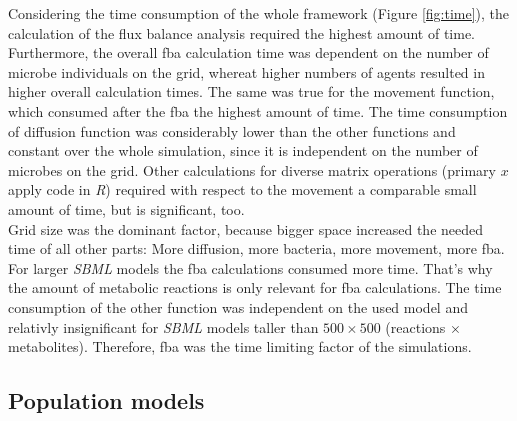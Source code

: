 Considering the time consumption of the whole framework (Figure \hyperref[fig:time]{\ref{fig:time}}), the calculation of the flux balance analysis required the highest amount of time.
Furthermore, the overall fba calculation time was dependent on the number of microbe individuals on the grid, whereat higher numbers of agents resulted in higher overall calculation times. The same was true for the movement function, which consumed after the fba the highest amount of time. The time consumption of diffusion function was considerably lower than the other functions and constant over the whole simulation, since it is independent on the number of microbes on the grid. Other
calculations for diverse matrix operations (primary $x$apply code in \textit{R}) required with respect to the movement a comparable small amount of time, but is significant, too.\\
Grid size was the dominant factor, because bigger space increased the needed time of all other parts: More diffusion, more bacteria, more movement, more fba.
For larger \textit{SBML} models the fba calculations consumed more time.
That's why the amount of metabolic reactions is only relevant for fba calculations.
The time consumption of the other function was independent on the used model and relativly insignificant for \textit{SBML} models taller than $500\times 500$ (reactions $\times$ metabolites).
Therefore, fba was the time limiting factor of the simulations.

\subsection{Population models}

